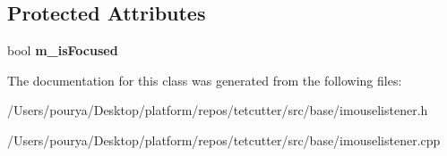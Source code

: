 \subsection*{Protected Attributes}
\begin{DoxyCompactItemize}
\item 
\hypertarget{classps_1_1IMouseListener_a94bdb76017ab7539c809c2c58b104971}{}bool {\bfseries m\+\_\+is\+Focused}\label{classps_1_1IMouseListener_a94bdb76017ab7539c809c2c58b104971}

\end{DoxyCompactItemize}


The documentation for this class was generated from the following files\+:\begin{DoxyCompactItemize}
\item 
/\+Users/pourya/\+Desktop/platform/repos/tetcutter/src/base/imouselistener.\+h\item 
/\+Users/pourya/\+Desktop/platform/repos/tetcutter/src/base/imouselistener.\+cpp\end{DoxyCompactItemize}
